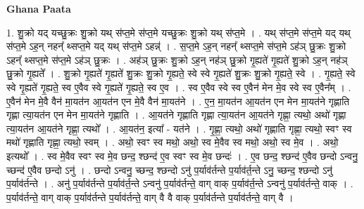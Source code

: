 \documentclass[17pt]{extarticle}
\begin{document}
\textbf{Ghana Paata } \newline

1. शु॒क्रो यद् यच्छु॒क्रः शु॒क्रो यथ् स॑प्त॒मे स॑प्त॒मे यच्छु॒क्रः शु॒क्रो यथ् स॑प्त॒मे । . यथ् स॑प्त॒मे स॑प्त॒मे यद् यथ् स॑प्त॒मे ऽह॒न् नहन्᳚ थ्सप्त॒मे यद् यथ् स॑प्त॒मे ऽहन्न्॑ । . स॒प्त॒मे ऽह॒न् नहन्᳚ थ्सप्त॒मे स॑प्त॒मे ऽह॑ञ् छु॒क्रः शु॒क्रो ऽहन्᳚ थ्सप्त॒मे स॑प्त॒मे ऽह॑ञ् छु॒क्रः । . अह॑ञ् छु॒क्रः शु॒क्रो ऽह॒न् नह॑ञ् छु॒क्रो गृ॒ह्यते॑ गृ॒ह्यते॑ शु॒क्रो ऽह॒न् नह॑ञ् छु॒क्रो गृ॒ह्यते᳚ । . शु॒क्रो गृ॒ह्यते॑ गृ॒ह्यते॑ शु॒क्रः शु॒क्रो गृ॒ह्यते॒ स्वे स्वे गृ॒ह्यते॑ शु॒क्रः शु॒क्रो गृ॒ह्यते॒ स्वे । . गृ॒ह्यते॒ स्वे स्वे गृ॒ह्यते॑ गृ॒ह्यते॒ स्व ए॒वैव स्वे गृ॒ह्यते॑ गृ॒ह्यते॒ स्व ए॒व । . स्व ए॒वैव स्वे स्व ए॒वैन॑ मेन मे॒व स्वे स्व ए॒वैन᳚म् । . ए॒वैन॑ मेन मे॒वै वैन॑ मा॒यत॑न आ॒यत॑न एन मे॒वै वैन॑ मा॒यत॑ने । . ए॒न॒ मा॒यत॑न आ॒यत॑न एन मेन मा॒यत॑ने गृह्णाति गृह्णा त्या॒यत॑न एन मेन मा॒यत॑ने गृह्णाति । . आ॒यत॑ने गृह्णाति गृह्णा त्या॒यत॑न आ॒यत॑ने गृह्णा॒ त्यथो॒ अथो॑ गृह्णा त्या॒यत॑न आ॒यत॑ने गृह्णा॒ त्यथो᳚ । . आ॒यत॑न॒ इत्या᳚ - यत॑ने । . गृ॒ह्णा॒ त्यथो॒ अथो॑ गृह्णाति गृह्णा॒ त्यथो॒ स्वꣳ स्व मथो॑ गृह्णाति गृह्णा॒ त्यथो॒ स्वम् । . अथो॒ स्वꣳ स्व मथो॒ अथो॒ स्व मे॒वैव स्व मथो॒ अथो॒ स्व मे॒व । . अथो॒ इत्यथो᳚ । . स्व मे॒वैव स्वꣳ स्व मे॒व छन्द॒ श्छन्द॑ ए॒व स्वꣳ स्व मे॒व छन्दः॑ । . ए॒व छन्द॒ श्छन्द॑ ए॒वैव छन्दो ऽन्वनु॒ च्छन्द॑ ए॒वैव छन्दो ऽनु॑ । . छन्दो ऽन्वनु॒ च्छन्द॒ श्छन्दो ऽनु॑ प॒र्याव॑र्तन्ते प॒र्याव॑र्त॒न्ते ऽनु॒ च्छन्द॒ श्छन्दो ऽनु॑ प॒र्याव॑र्तन्ते । . अनु॑ प॒र्याव॑र्तन्ते प॒र्याव॑र्त॒न्ते ऽन्वनु॑ प॒र्याव॑र्तन्ते॒ वाग् वाक् प॒र्याव॑र्त॒न्ते ऽन्वनु॑ प॒र्याव॑र्तन्ते॒ वाक् । . प॒र्याव॑र्तन्ते॒ वाग् वाक् प॒र्याव॑र्तन्ते प॒र्याव॑र्तन्ते॒ वाग् वै वै वाक् प॒र्याव॑र्तन्ते प॒र्याव॑र्तन्ते॒ वाग् वै । \newline
\end{document}
